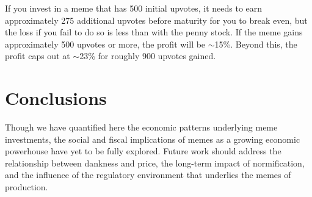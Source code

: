 \documentclass[a4paper, 12pt]{article}
\begin{document}
If you invest in a meme that has 500 initial upvotes, it needs to earn approximately 275
additional upvotes before maturity for you to break even, but the loss if you
fail to do so is less than with the penny stock. If the meme gains approximately
500 upvotes or more, the profit will be \(\sim\)15\%. Beyond this, the profit caps out at \(\sim\)23\%
for roughly 900 upvotes gained.

\section*{Conclusions}
\label{sec:org015206a}

Though we have quantified here the economic patterns underlying meme investments, the
social and fiscal implications of memes as a growing economic powerhouse have
yet to be fully explored. Future work should address the relationship between
dankness and price, the long-term impact of normification, and the influence of
the regulatory environment that underlies the memes of production.



\end{document}
